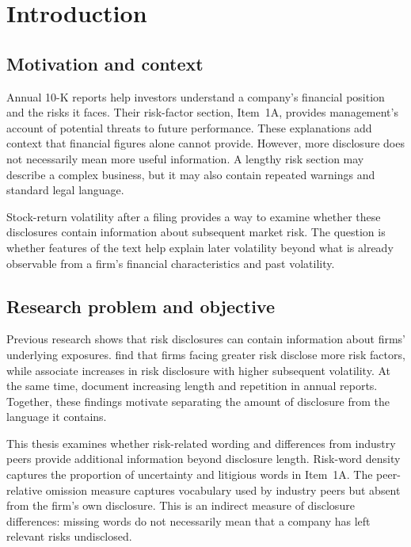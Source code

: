 \chapter*{Introduction}
\label{ch:introduction}

\section*{Motivation and context}

Annual 10-K reports help investors understand a company's financial position
and the risks it faces. Their risk-factor section, Item~1A, provides
management's account of potential threats to future performance. These
explanations add context that financial figures alone cannot provide. However,
more disclosure does not necessarily mean more useful information. A lengthy
risk section may describe a complex business, but it may also contain repeated
warnings and standard legal language.

Stock-return volatility after a filing provides a way to examine whether these
disclosures contain information about subsequent market risk. The question is
whether features of the text help explain later volatility beyond what is
already observable from a firm's financial characteristics and past volatility.

\section*{Research problem and objective}

Previous research shows that risk disclosures can contain information about
firms' underlying exposures. \textcite{campbell2014} find that firms facing
greater risk disclose more risk factors, while \textcite{kravet2013} associate
increases in risk disclosure with higher subsequent volatility. At the same
time, \textcite{dyer2017} document increasing length and repetition in annual
reports. Together, these findings motivate separating the amount of disclosure
from the language it contains.

This thesis examines whether risk-related wording and differences from industry
peers provide additional information beyond disclosure length. Risk-word
density captures the proportion of uncertainty and litigious words in Item~1A.
The peer-relative omission measure captures vocabulary used by industry peers
but absent from the firm's own disclosure. This is an indirect measure of
disclosure differences: missing words do not necessarily mean that a company
has left relevant risks undisclosed.


